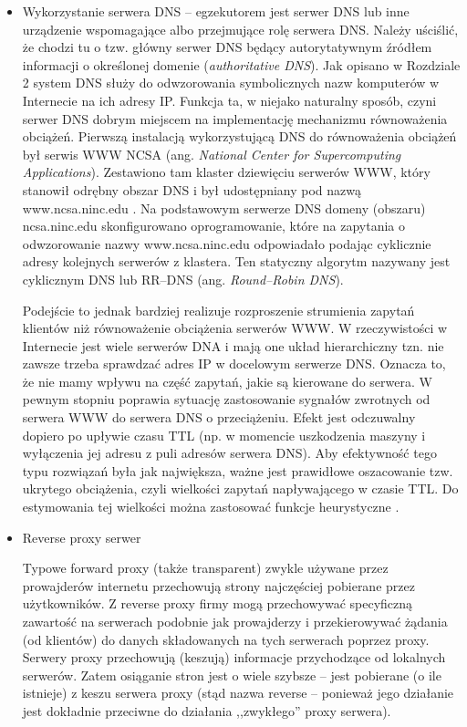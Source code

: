 \begin{itemize}
\item Wykorzystanie serwera DNS -- 
egzekutorem jest serwer DNS lub inne urządzenie wspomagające albo przejmujące rolę serwera DNS. Należy uściślić, 
że chodzi tu o tzw. główny serwer DNS będący autorytatywnym źródłem informacji o określonej domenie (\emph{authoritative DNS}).
Jak opisano w Rozdziale 2 system DNS służy do odwzorowania symbolicznych nazw komputerów w Internecie na ich 
adresy IP. Funkcja ta, w niejako naturalny sposób, czyni serwer DNS dobrym miejscem na implementację mechanizmu 
równoważenia obciążeń. Pierwszą instalacją wykorzystującą  DNS do równoważenia obciążeń był serwis WWW NCSA 
(ang. \emph{National Center for Supercomputing Applications}). Zestawiono tam klaster dziewięciu serwerów WWW, który 
stanowił odrębny obszar DNS i był udostępniany pod nazwą www.ncsa.ninc.edu \cite{barylo28,barylo29}. Na podstawowym serwerze 
DNS  domeny (obszaru) ncsa.ninc.edu skonfigurowano oprogramowanie, które na zapytania o odwzorowanie nazwy 
www.ncsa.ninc.edu odpowiadało podając cyklicznie adresy kolejnych serwerów z klastera. Ten statyczny algorytm 
nazywany jest cyklicznym DNS lub RR--DNS (ang. \emph{Round--Robin DNS}). 

Podejście to jednak bardziej realizuje rozproszenie strumienia zapytań klientów niż równoważenie obciążenia serwerów WWW. W
rzeczywistości w Internecie jest wiele serwerów DNA i mają one układ hierarchiczny tzn. nie zawsze trzeba sprawdzać adres IP
w docelowym serwerze DNS. Oznacza to, że nie mamy wpływu na część zapytań, jakie są kierowane do serwera. W pewnym stopniu
poprawia sytuację zastosowanie sygnałów zwrotnych od serwera WWW do serwera DNS o przeciążeniu. Efekt jest odczuwalny dopiero 
po upływie czasu TTL (np. w momencie uszkodzenia maszyny i wyłączenia jej adresu z puli adresów serwera DNS). Aby efektywność
tego typu rozwiązań była jak największa, ważne jest prawidłowe oszacowanie tzw. ukrytego obciążenia, czyli wielkości zapytań
napływającego w czasie TTL. Do estymowania tej wielkości można zastosować funkcje heurystyczne \cite{gliwice4}.

\item Reverse proxy serwer

Typowe forward proxy (także transparent) zwykle używane przez prowajderów internetu przechowują strony najczęściej pobierane 
przez użytkowników. Z reverse proxy firmy mogą przechowywać specyficzną zawartość na 
serwerach podobnie jak prowajderzy i przekierowywać żądania (od klientów) do danych składowanych na tych serwerach poprzez 
proxy. Serwery 
proxy przechowują (keszują) informacje przychodzące od lokalnych serwerów. Zatem osiąganie stron jest o wiele szybsze -- jest 
pobierane (o ile istnieje) z keszu serwera proxy (stąd nazwa reverse -- ponieważ jego działanie jest dokładnie przeciwne do 
działania ,,zwykłego'' proxy serwera). 


\end{itemize}
